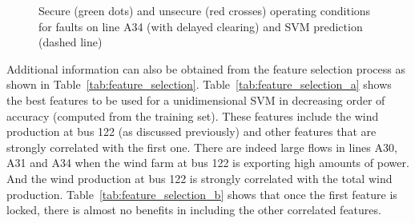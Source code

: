 
\begin{figure}
\centering
{}
\caption{Secure (green dots) and unsecure (red crosses) operating conditions for faults on line A34 (with delayed clearing) and SVM prediction (dashed line)}
\label{fig:A34_SVM}
\end{figure}


Additional information can also be obtained from the feature selection process as shown in Table~\ref{tab:feature_selection}. Table~\ref{tab:feature_selection_a} shows the best features to be used for a unidimensional SVM in decreasing order of accuracy (computed from the training set). These features include the wind production at bus 122 (as discussed previously) and other features that are strongly correlated with the first one. There are indeed large flows in lines A30, A31 and A34 when the wind farm at bus 122 is exporting high amounts of power. And the wind production at bus 122 is strongly correlated with the total wind production. Table~\ref{tab:feature_selection_b} shows that once the first feature is locked, there is almost no benefits in including the other correlated features.

